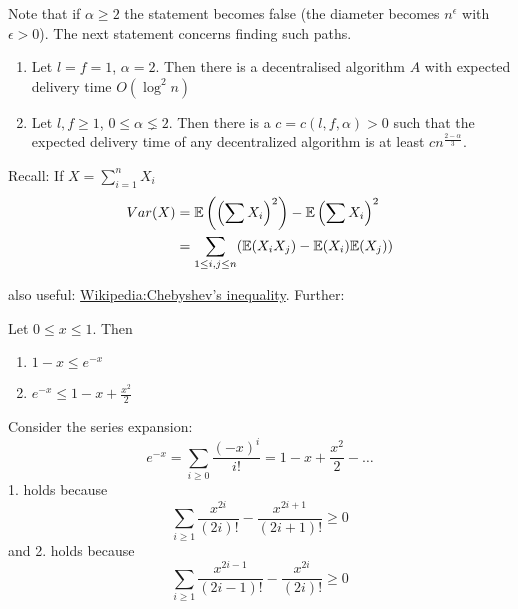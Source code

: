 Note that if $\alpha \geq 2$ the statement becomes false (the diameter becomes $n^\epsilon$ with $\epsilon > 0$). The next statement concerns finding such paths.

\begin{thm}\label{thm:finding_short_paths} \mbox{}\begin{enumerate}
\item Let $l=f=1$, $\alpha =2$. Then there is a decentralised algorithm $A$ with expected delivery time $O(\log^2n)$
\item Let $l,f\geq 1$, $0 \leq \alpha \lneq 2$. Then there is a $c=c(l,f,\alpha)>0$ such that the expected delivery time of any decentralized algorithm is at least $c n^{\frac{2-\alpha}{3}}$.
\end{enumerate}
\end{thm}

Recall: If $X = \sum_{i=1}^n X_i$
\begin{align*}
Var(X) &= \mathbb{E}\left(\left(\sum X_i\right)^2\right) - \mathbb{E}\left(\sum X_i\right)^2\\
	&= \sum_{1\leq i, j\leq n} (\mathbb{E}(X_iX_j) - \mathbb{E}(X_i)\mathbb{E}(X_j))
\end{align*}

also useful: \href{http://en.wikipedia.org/wiki/Chebyshev\%27s_inequality}{Wikipedia:Chebyshev's inequality}. Further:

\begin{lem} Let $0\leq x \leq 1$. Then
\begin{enumerate}
\item $1-x\leq e^{-x}$
\item $e^{-x} \leq 1-x+\frac{x^2}{2}$
\end{enumerate}
\end{lem}
\begin{pr} Consider the series expansion:
\[e^{-x} = \sum_{i\geq 0} \frac{(-x)^i}{i!} = 1-x+\frac{x^2}{2} - \ldots\]
1. holds because 
\[\sum_{i\geq 1} \frac{x^{2i}}{(2i)!} - \frac{x^{2i+1}}{(2i+1)!} \geq 0\]
and 2. holds because
\[\sum_{i\geq 1} \frac{x^{2i-1}}{(2i-1)!} - \frac{x^{2i}}{(2i)!} \geq 0\]
\end{pr}

